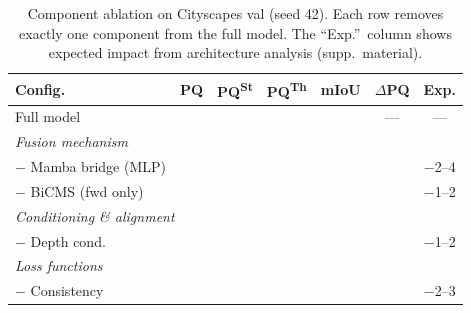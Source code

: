 \documentclass[10pt,twocolumn,letterpaper]{article}
\begin{document}
\begin{table}[t]
\centering
\caption{Component ablation on Cityscapes val (seed 42). Each row removes exactly one component from the full model. The ``Exp.''\ column shows expected impact from architecture analysis (supp.\ material).}
\label{tab:ablations}
\setlength{\tabcolsep}{2pt}
\begin{tabular}{p{2.5cm}cccccc}
\toprule
Config. & PQ & PQ\textsuperscript{St} & PQ\textsuperscript{Th} & mIoU & $\Delta$PQ & Exp. \\
\midrule
Full model & \underline{\hspace{1em}} & \underline{\hspace{1em}} & \underline{\hspace{1em}} & \underline{\hspace{1em}} & --- & --- \\
\midrule
\multicolumn{7}{l}{\emph{Fusion mechanism}} \\
$-$ Mamba bridge (MLP) & \underline{\hspace{1em}} & \underline{\hspace{1em}} & \underline{\hspace{1em}} & \underline{\hspace{1em}} & \underline{\hspace{1em}} & $-$2--4 \\
$-$ BiCMS (fwd only) & \underline{\hspace{1em}} & \underline{\hspace{1em}} & \underline{\hspace{1em}} & \underline{\hspace{1em}} & \underline{\hspace{1em}} & $-$1--2 \\
\midrule
\multicolumn{7}{l}{\emph{Conditioning \& alignment}} \\
$-$ Depth cond. & \underline{\hspace{1em}} & \underline{\hspace{1em}} & \underline{\hspace{1em}} & \underline{\hspace{1em}} & \underline{\hspace{1em}} & $-$1--2 \\
\midrule
\multicolumn{7}{l}{\emph{Loss functions}} \\
$-$ Consistency & \underline{\hspace{1em}} & \underline{\hspace{1em}} & \underline{\hspace{1em}} & \underline{\hspace{1em}} & \underline{\hspace{1em}} & $-$2--3 \\

\end{tabular}
\end{table}
\end{document}
